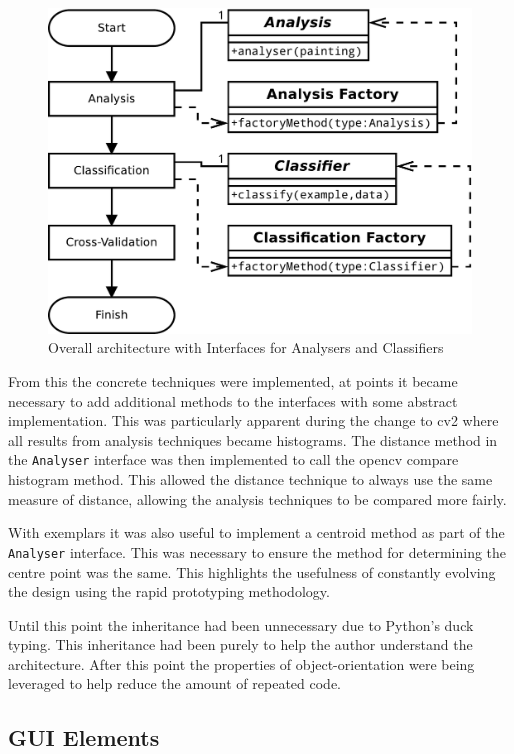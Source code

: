 \begin{figure}[h]
\centering
\includegraphics[scale=0.4]{img/interfaces-arch}
\caption{Overall architecture with Interfaces for Analysers and Classifiers}\label{fig:interfaces-arch}
\end{figure}

From this the concrete techniques were implemented, at points it became necessary to add additional 
methods to the interfaces with some abstract implementation. This was particularly
apparent during the change to \gls{cv2} where all results from analysis techniques became 
histograms. The distance method in the \texttt{Analyser} interface was then implemented to call
the \gls{opencv} compare histogram method. This allowed the distance technique to always use 
the same measure of distance, allowing the analysis techniques to be compared more fairly.

With exemplars it was also useful to implement a centroid method as part of the \texttt{Analyser}
interface. This was necessary to ensure the method for determining the centre point was the same. This highlights the 
usefulness of constantly evolving the design using the rapid prototyping methodology.

Until this point the inheritance had been unnecessary due to Python's duck typing. This inheritance had been
purely to help the author understand the architecture. After this point the properties of 
object-orientation were being leveraged to help reduce the amount of repeated code.

\subsection{GUI Elements}

